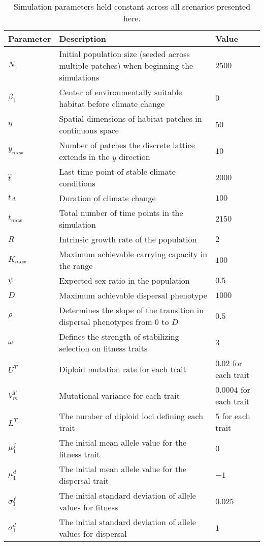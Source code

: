 \documentclass[11pt, oneside]{article}
\begin{document}
\begin{table}
\renewcommand{\arraystretch}{1.5}
  \begin{tabular}{ p{2cm} | p{8cm} | p{2cm} }
    \hline
    Parameter & Description & Value \\ \hline \hline
    $N_{1}$ & Initial population size (seeded across multiple patches) when beginning the simulations & $2500$ \\
    $\beta_{1}$ & Center of environmentally suitable habitat before climate change & $0$ \\
    $\eta$ & Spatial dimensions of habitat patches in continuous space & $50$ \\
    $y_{max}$ & Number of patches the discrete lattice extends in the $y$ direction & $10$ \\
    $\hat{t}$ & Last time point of stable climate conditions & $2000$ \\
    $t_{\Delta}$ & Duration of climate change & $100$ \\
    $t_{max}$ & Total number of time points in the simulation & $2150$ \\
    $R$ & Intrinsic growth rate of the population & $2$ \\
    $K_{max}$ & Maximum achievable carrying capacity in the range & $100$ \\ 
    $\psi$ & Expected sex ratio in the population & $0.5$ \\
    $D$ & Maximum achievable dispersal phenotype & $1000$ \\
    $\rho$ & Determines the slope of the transition in dispersal phenotypes from $0$ to $D$ & $0.5$ \\
    $\omega$ & Defines the strength of stabilizing selection on fitness traits & $3$ \\
    $U^{T}$ & Diploid mutation rate for each trait & $0.02$ for each trait \\
    $V_{m}^{T}$ & Mutational variance for each trait & $0.0004$ for each trait \\
    $L^{T}$ & The number of diploid loci defining each trait & $5$ for each trait \\
    $\mu_{1}^{f}$ & The initial mean allele value for the fitness trait & $0$ \\
    $\mu_{1}^{d}$ & The initial mean allele value for the dispersal trait & $-1$ \\
    $\sigma_{1}^{f}$ & The initial standard deviation of allele values for fitness & $0.025$ \\
    $\sigma_{1}^{d}$ & The initial standard deviation of allele values for dispersal & $1$ \\
    \hline
  \end{tabular}
\caption[LoF entry]{Simulation parameters held constant across all scenarios presented here.}
\label{table:ConstPars}
\end{table}
\end{document}
